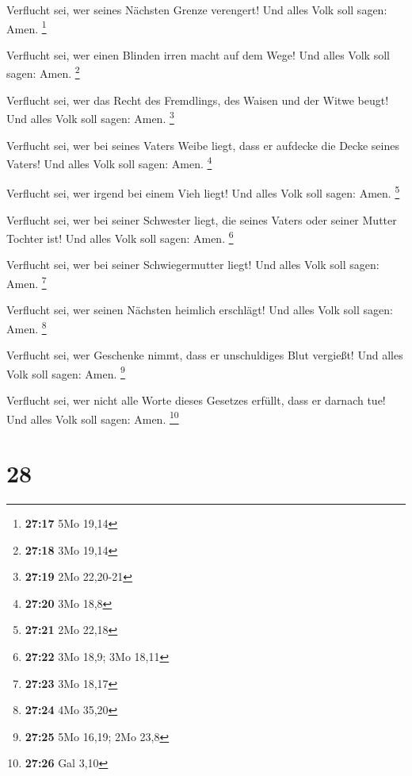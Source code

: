  Verflucht sei, wer seines Nächsten Grenze verengert! Und
alles Volk soll sagen: Amen. \footnote{\textbf{27:17} 5Mo 19,14}

 Verflucht sei, wer einen Blinden irren macht auf dem
Wege! Und alles Volk soll sagen: Amen. \footnote{\textbf{27:18} 3Mo
  19,14}

 Verflucht sei, wer das Recht des Fremdlings, des Waisen
und der Witwe beugt! Und alles Volk soll sagen: Amen. \footnote{\textbf{27:19}
  2Mo 22,20-21}

 Verflucht sei, wer bei seines Vaters Weibe liegt, dass
er aufdecke die Decke seines Vaters! Und alles Volk soll sagen: Amen.
\footnote{\textbf{27:20} 3Mo 18,8}

 Verflucht sei, wer irgend bei einem Vieh liegt! Und
alles Volk soll sagen: Amen. \footnote{\textbf{27:21} 2Mo 22,18}

 Verflucht sei, wer bei seiner Schwester liegt, die
seines Vaters oder seiner Mutter Tochter ist! Und alles Volk soll sagen:
Amen. \footnote{\textbf{27:22} 3Mo 18,9; 3Mo 18,11}

 Verflucht sei, wer bei seiner Schwiegermutter liegt! Und
alles Volk soll sagen: Amen. \footnote{\textbf{27:23} 3Mo 18,17}

 Verflucht sei, wer seinen Nächsten heimlich erschlägt!
Und alles Volk soll sagen: Amen. \footnote{\textbf{27:24} 4Mo 35,20}

 Verflucht sei, wer Geschenke nimmt, dass er unschuldiges
Blut vergießt! Und alles Volk soll sagen: Amen. \footnote{\textbf{27:25}
  5Mo 16,19; 2Mo 23,8}

 Verflucht sei, wer nicht alle Worte dieses Gesetzes
erfüllt, dass er darnach tue! Und alles Volk soll sagen: Amen.
\footnote{\textbf{27:26} Gal 3,10}

\hypertarget{section-7}{%
\section{28}\label{section-7}}

